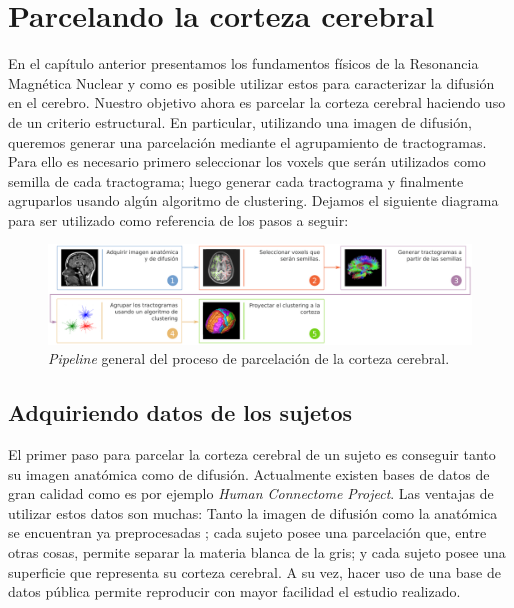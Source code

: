 \chapter{Parcelando la corteza cerebral}
\label{ch:metodos}

En el cap\'itulo anterior presentamos los fundamentos f\'isicos de la
Resonancia Magn\'etica Nuclear y como es posible utilizar estos para
caracterizar la difusi\'on en el cerebro. Nuestro objetivo ahora es
parcelar la corteza cerebral haciendo uso de un criterio estructural. En
particular, utilizando una imagen de difusi\'on, queremos generar una
parcelaci\'on mediante el agrupamiento de tractogramas. Para ello es
necesario primero seleccionar los voxels que ser\'an utilizados como
semilla de cada tractograma; luego generar cada tractograma y finalmente
agruparlos usando alg\'un algoritmo de clustering. Dejamos el siguiente
diagrama para ser utilizado como referencia de los pasos a seguir: \\

\begin{figure}[h!]

\centering
\includegraphics[width=\textwidth]{img/diagrama.png}
\caption{\textit{Pipeline} general del proceso de parcelaci\'on de la corteza cerebral.}
\label{fig:diagrama}

\end{figure}  

\section{Adquiriendo datos de los sujetos}
\label{sec:hcp}

El primer paso para parcelar la corteza cerebral de un sujeto es conseguir
tanto su imagen anat\'omica como de difusi\'on. Actualmente existen bases
de datos de gran calidad como es por ejemplo \textit{Human Connectome
Project}. \cite{VanEssen2012} Las ventajas de utilizar estos datos son
muchas: Tanto la imagen de difusi\'on como la anat\'omica se encuentran ya
preprocesadas \cite{Glasser2013}; cada sujeto posee una parcelaci\'on que,
entre otras cosas, permite separar la materia blanca de la gris; y cada
sujeto posee una superficie que representa su corteza cerebral. A su vez,
hacer uso de una base de datos p\'ublica permite reproducir con mayor
facilidad el estudio realizado.\\






